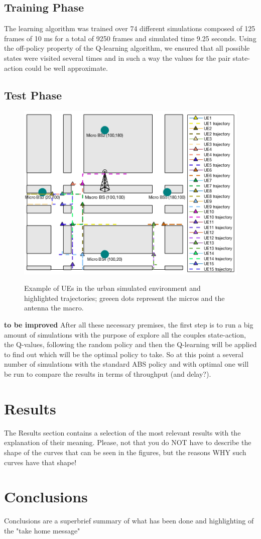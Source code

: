 \documentclass[conference,10pt]{IEEEtran}
\begin{document}
\subsection{Training Phase}
The learning algorithm was trained over 74 different simulations composed of 125 frames of 10 ms for a total of 9250 frames and simulated time 9.25 seconds.
Using the off-policy property of the Q-learning algorithm, we ensured that all possible states were visited several times and in such a way the values for the pair state-action could be well approximate.
\subsection{Test Phase}

\begin{figure}[h]
\includegraphics[scale=0.54]{figures/traj.png}
\label{img:map}
\caption{Example of UEs in the urban simulated environment and highlighted trajectories; greeen dots represent the micros and the antenna the macro.} 
\end{figure}
\textbf{to be improved} After all these necessary premises, the first step is to run a big amount of simulations with the purpose of explore all the couples state-action, the Q-values, following the random policy and then the Q-learning will be applied to find out which will be the optimal policy to take. So at this point a several number of simulations with the standard ABS policy and with optimal one will be run to compare the results in terms of throughput (and delay?).         
\section{Results}\label{sec:res}
The Results section contains a selection of the most relevant results with the explanation of their meaning. Please, not that you do NOT have to describe the shape of the curves that can be seen in the figures, but the reasons WHY such curves have that shape!
\section{Conclusions}\label{sec:conclusion}
Conclusions are a superbrief summary of what has been done and highlighting of the "take home message"
\newpage
\nocite{*}


\end{document}
